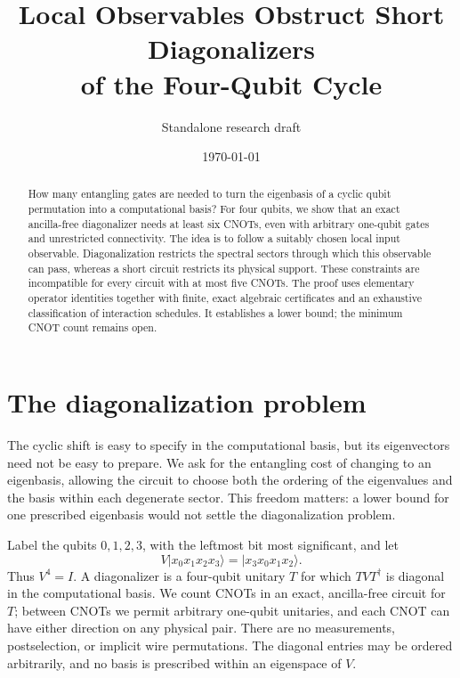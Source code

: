 \documentclass[11pt]{article}
\title{Local Observables Obstruct Short Diagonalizers\\of the Four-Qubit Cycle}
\author{Standalone research draft}
\date{\today}
\begin{document}
\maketitle

\begin{abstract}
How many entangling gates are needed to turn the eigenbasis of a cyclic
qubit permutation into a computational basis? For four qubits, we show
that an exact ancilla-free diagonalizer needs at least six CNOTs, even
with arbitrary one-qubit gates and unrestricted connectivity. The idea
is to follow a suitably chosen local input observable. Diagonalization
restricts the spectral sectors through which this observable can pass,
whereas a short circuit restricts its physical support. These constraints
are incompatible for every circuit with at most five CNOTs. The proof
uses elementary operator identities together with finite, exact algebraic
certificates and an exhaustive classification of interaction schedules.
It establishes a lower bound; the minimum CNOT count remains open.
\end{abstract}

\section{The diagonalization problem}

The cyclic shift is easy to specify in the computational basis, but its
eigenvectors need not be easy to prepare. We ask for the entangling cost
of changing to an eigenbasis, allowing the circuit to choose both the
ordering of the eigenvalues and the basis within each degenerate sector.
This freedom matters: a lower bound for one prescribed eigenbasis would
not settle the diagonalization problem.

Label the qubits $0,1,2,3$, with the leftmost bit most significant, and let
\begin{equation}\label{eq:shift}
V\lvert x_0x_1x_2x_3\rangle
 =\lvert x_3x_0x_1x_2\rangle .
\end{equation}
Thus $V^4=I$.  A diagonalizer is a four-qubit unitary $T$ for which
$TVT^\dagger$ is diagonal in the computational basis.  We count CNOTs in an
exact, ancilla-free circuit for $T$; between CNOTs we permit arbitrary
one-qubit unitaries, and each CNOT can have either direction on any physical
pair.  There are no measurements, postselection, or implicit wire
permutations.  The diagonal entries may be ordered arbitrarily, and no basis
is prescribed within an eigenspace of $V$.
\end{document}
